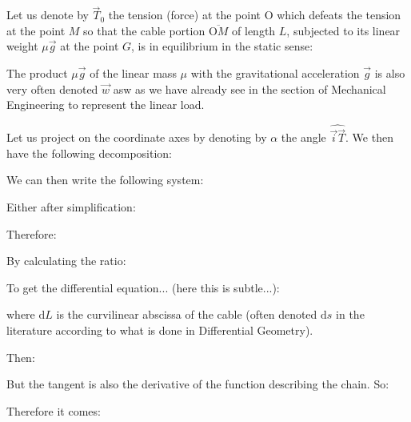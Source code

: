 	Let us denote by $\vec{T}_0$ the tension (force) at the point O which defeats the tension at the point $M$ so that the cable portion $\overline{\text{O}M}$ of length $L$, subjected to its linear weight $\mu\vec{g}$ at the point $G$, is in equilibrium in the static sense:
	
	\begin{tcolorbox}[title=Remark,colframe=black,arc=10pt]
	The product $\mu\vec{g}$ of the linear mass $\mu$ with the gravitational acceleration $\vec{g}$ is also very often denoted $\vec{w}$ asw as we have already see in the section of Mechanical Engineering to represent the linear load.
	\end{tcolorbox}
	Let us project on the coordinate axes by denoting by $\alpha$ the angle $\widehat{\vec{i}\vec{T}}$. We then have the following decomposition:
	
	We can then write the following system:
	
	Either after simplification:
	
	Therefore:
	
	By calculating the ratio:
	
	To get the differential equation... (here this is subtle...):
	
	where $\mathrm{d}L$ is the curvilinear abscissa of the cable (often denoted $\mathrm{d}s$ in the literature according to what is done in Differential Geometry).

	Then:
	
	But the tangent is also the derivative of the function describing the chain. So:
	
	Therefore it comes:
	
